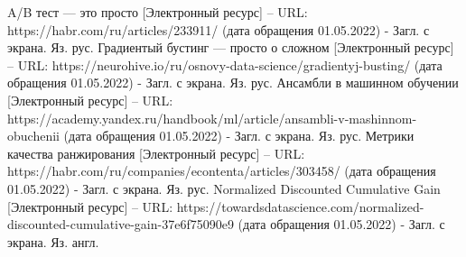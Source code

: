 \documentclass[bachelor, och, coursework]{SCWorks}
\begin{document}
\begin{thebibliography}{99}
    A/B тест — это просто [Электронный ресурс] – URL: https://habr.com/ru/articles/233911/ (дата обращения 01.05.2022) - Загл. с экрана. Яз. рус.
    Градиентый бустинг — просто о сложном [Электронный ресурс] – URL: https://neurohive.io/ru/osnovy-data-science/gradientyj-busting/ (дата обращения 01.05.2022) - Загл. с экрана. Яз. рус.
    Ансамбли в машинном обучении [Электронный ресурс] – URL: https://academy.yandex.ru/handbook/ml/article/ansambli-v-mashinnom-obuchenii (дата обращения 01.05.2022) - Загл. с экрана. Яз. рус.
    Метрики качества ранжирования [Электронный ресурс] – URL: https://habr.com/ru/companies/econtenta/articles/303458/ (дата обращения 01.05.2022) - Загл. с экрана. Яз. рус.
    Normalized Discounted Cumulative Gain [Электронный ресурс] – URL: https://towardsdatascience.com/normalized-discounted-cumulative-gain-37e6f75090e9 (дата обращения 01.05.2022) - Загл. с экрана. Яз. англ.
\end{thebibliography}

\appendix



\end{document}
